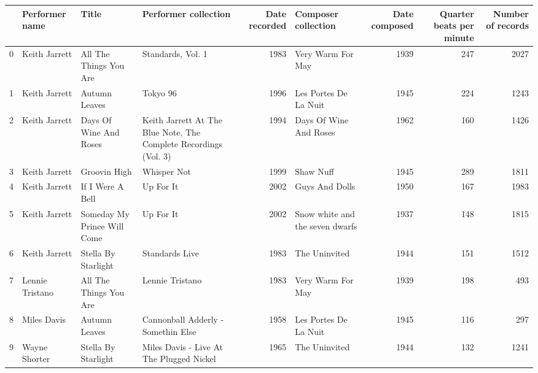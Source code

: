 \documentclass[11pt]{article}
\begin{document}
    \begin{tabular}{llllrlrrr}
\toprule
{} &   Performer name &                        Title &                                              Performer collection &  Date recorded &              Composer collection &  Date composed &  Quarter beats per minute &  Number of records \\
\midrule
0 &  Keith Jarrett &  All The Things You Are &  Standards, Vol. 1 &  1983 &  Very Warm For May &  1939 &  247 &  2027 \\
1 &  Keith Jarrett &  Autumn Leaves &  Tokyo 96 &  1996 &  Les Portes De La Nuit &  1945 &  224 &  1243 \\
2 &  Keith Jarrett &  Days Of Wine And Roses &  Keith Jarrett At The Blue Note, The Complete Recordings (Vol. 3) &  1994 &  Days Of Wine And Roses &  1962 &  160 &  1426 \\
3 &  Keith Jarrett &  Groovin High &  Whisper Not &  1999 &  Shaw Nuff &  1945 &  289 &  1811 \\
4 &  Keith Jarrett &  If I Were A Bell &  Up For It &  2002 &  Guys And Dolls &  1950 &  167 &  1983 \\
5 &  Keith Jarrett &  Someday My Prince Will Come &  Up For It &  2002 &  Snow white and the seven dwarfs &  1937 &  148 &  1815 \\
6 &  Keith Jarrett &  Stella By Starlight &  Standards Live &  1983 &  The Uninvited &  1944 &  151 &  1512 \\
7 &  Lennie Tristano &  All The Things You Are &  Lennie Tristano &  1983 &  Very Warm For May &  1939 &  198 &  493 \\
8 &  Miles Davis &  Autumn Leaves &  Cannonball Adderly - Somethin Else &  1958 &  Les Portes De La Nuit &  1945 &  116 &  297 \\
9 &  Wayne Shorter &  Stella By Starlight &  Miles Davis - Live At The Plugged Nickel &  1965 &  The Uninvited &  1944 &  132 &  1241 \\
\bottomrule
\end{tabular}

    
\end{document}
